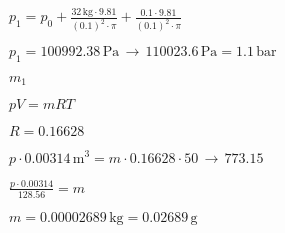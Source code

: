 \( p_1 = p_0 + \frac{32 \, \text{kg} \cdot 9.81}{(0.1)^2 \cdot \pi} + \frac{0.1 \cdot 9.81}{(0.1)^2 \cdot \pi} \)  

\( p_1 = 100992.38 \, \text{Pa} \, \rightarrow \, 110023.6 \, \text{Pa} = 1.1 \, \text{bar} \)  

\( m_1 \)  

\( pV = mRT \)  

\( R = 0.16628 \)  

\( p \cdot 0.00314 \, \text{m}^3 = m \cdot 0.16628 \cdot 50 \, \rightarrow \, 773.15 \)  

\( \frac{p \cdot 0.00314}{128.56} = m \)  

\( m = 0.00002689 \, \text{kg} = 0.02689 \, \text{g} \)